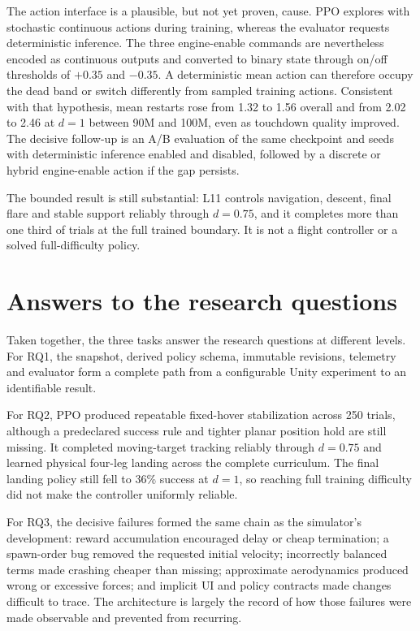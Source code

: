 The action interface is a plausible, but not yet proven, cause. PPO explores with stochastic
continuous actions during training, whereas the evaluator requests deterministic inference. The
three engine-enable commands are nevertheless encoded as continuous outputs and converted to
binary state through on/off thresholds of $+0.35$ and $-0.35$. A deterministic mean action can
therefore occupy the dead band or switch differently from sampled training actions. Consistent
with that hypothesis, mean restarts rose from 1.32 to 1.56 overall and from 2.02 to 2.46 at
$d=1$ between 90M and 100M, even as touchdown quality improved. The decisive follow-up is an
A/B evaluation of the same checkpoint and seeds with deterministic inference enabled and
disabled, followed by a discrete or hybrid engine-enable action if the gap persists.

The bounded result is still substantial: L11 controls navigation, descent, final flare and
stable support reliably through $d=0.75$, and it completes more than one third of trials at the
full trained boundary. It is not a flight controller or a solved full-difficulty policy.

\section{Answers to the research questions}

Taken together, the three tasks answer the research questions at different levels. For RQ1, the
snapshot, derived policy schema, immutable revisions, telemetry and evaluator form a complete
path from a configurable Unity experiment to an identifiable result.

For RQ2, PPO produced repeatable fixed-hover stabilization across 250 trials, although a
predeclared success rule and tighter planar position hold are still missing. It completed
moving-target tracking reliably through $d=0.75$ and learned physical four-leg landing across
the complete curriculum. The final landing policy still fell to 36\% success at $d=1$, so
reaching full training difficulty did not make the controller uniformly reliable.

For RQ3, the decisive failures formed the same chain as the simulator's development: reward
accumulation encouraged delay or cheap termination; a spawn-order bug removed the requested
initial velocity; incorrectly balanced terms made crashing cheaper than missing; approximate
aerodynamics produced wrong or excessive forces; and implicit UI and policy contracts made
changes difficult to trace. The architecture is largely the record of how those failures were
made observable and prevented from recurring.
